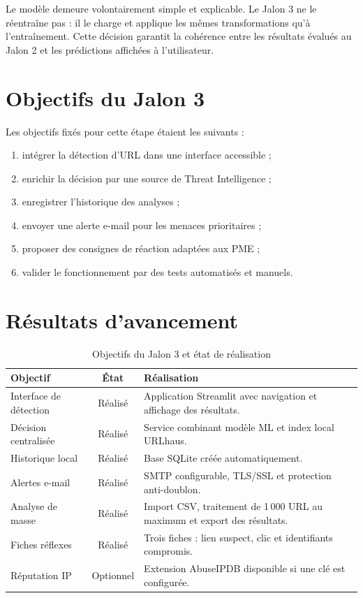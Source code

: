 \documentclass[11pt,a4paper]{report}
\begin{document}
Le modèle demeure volontairement simple et explicable. Le Jalon 3 ne le
réentraîne pas : il le charge et applique les mêmes transformations qu'à
l'entraînement. Cette décision garantit la cohérence entre les résultats
évalués au Jalon 2 et les prédictions affichées à l'utilisateur.

\section{Objectifs du Jalon 3}

Les objectifs fixés pour cette étape étaient les suivants :

\begin{enumerate}
  \item intégrer la détection d'URL dans une interface accessible ;
  \item enrichir la décision par une source de Threat Intelligence ;
  \item enregistrer l'historique des analyses ;
  \item envoyer une alerte e-mail pour les menaces prioritaires ;
  \item proposer des consignes de réaction adaptées aux PME ;
  \item valider le fonctionnement par des tests automatisés et manuels.
\end{enumerate}

\section{Résultats d'avancement}

\begin{table}[H]
\centering
\caption{Objectifs du Jalon 3 et état de réalisation}
\begin{tabularx}{\textwidth}{p{}cX}
\toprule
\textbf{Objectif} & \textbf{État} & \textbf{Réalisation}\\
\midrule
Interface de détection & Réalisé & Application Streamlit avec navigation et affichage des résultats.\\
Décision centralisée & Réalisé & Service combinant modèle ML et index local URLhaus.\\
Historique local & Réalisé & Base SQLite créée automatiquement.\\
Alertes e-mail & Réalisé & SMTP configurable, TLS/SSL et protection anti-doublon.\\
Analyse de masse & Réalisé & Import CSV, traitement de 1\,000 URL au maximum et export des résultats.\\
Fiches réflexes & Réalisé & Trois fiches : lien suspect, clic et identifiants compromis.\\
Réputation IP & Optionnel & Extension AbuseIPDB disponible si une clé est configurée.\\
\bottomrule
\end{tabularx}
\end{table}
\end{document}
